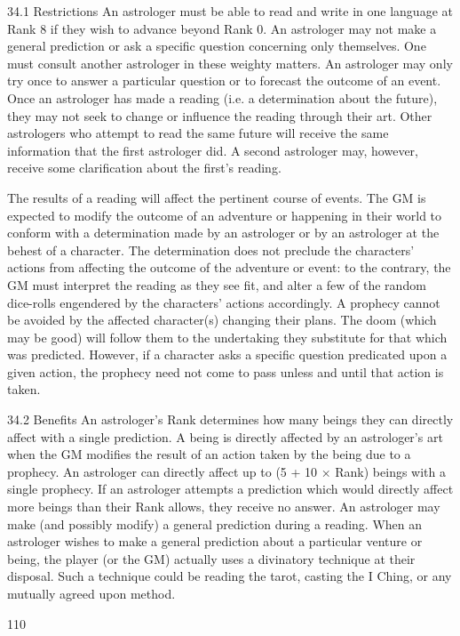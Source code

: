 \documentclass[a4paper]{article}
\begin{document}
\begin{multicols}{3}
34.1 Restrictions
An astrologer must be able to read and write in one
language at Rank 8 if they wish to advance beyond
Rank 0.
An astrologer may not make a general prediction or ask a specific question concerning only
themselves.
One must consult another astrologer in these
weighty matters.
An astrologer may only try once to answer a
particular question or to forecast the outcome of
an event.
Once an astrologer has made a reading (i.e. a determination about the future), they may not seek to
change or influence the reading through their art.
Other astrologers who attempt to read the same
future will receive the same information that the
first astrologer did. A second astrologer may, however, receive some clarification about the first’s
reading.

The results of a reading will affect the pertinent
course of events.
The GM is expected to modify the outcome of an
adventure or happening in their world to conform
with a determination made by an astrologer or by
an astrologer at the behest of a character. The
determination does not preclude the characters’
actions from affecting the outcome of the adventure or event: to the contrary, the GM must interpret the reading as they see fit, and alter a few of
the random dice-rolls engendered by the characters’ actions accordingly.
A prophecy cannot be avoided by the affected
character(s) changing their plans. The doom
(which may be good) will follow them to the undertaking they substitute for that which was predicted. However, if a character asks a specific
question predicated upon a given action, the prophecy need not come to pass unless and until that
action is taken.

34.2 Benefits
An astrologer’s Rank determines how many
beings they can directly affect with a single
prediction.
A being is directly affected by an astrologer’s art
when the GM modifies the result of an action taken
by the being due to a prophecy.
An astrologer can directly affect up to (5 + 10 ×
Rank) beings with a single prophecy. If an astrologer attempts a prediction which would directly
affect more beings than their Rank allows, they
receive no answer.
An astrologer may make (and possibly modify)
a general prediction during a reading.
When an astrologer wishes to make a general prediction about a particular venture or being, the
player (or the GM) actually uses a divinatory technique at their disposal. Such a technique could be
reading the tarot, casting the I Ching, or any mutually agreed upon method.

110


\end{multicols}
\end{document}
